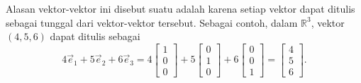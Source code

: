 Alasan vektor-vektor ini disebut suatu \emph{} adalah karena setiap
vektor dapat ditulis sebagai \emph{} tunggal dari vektor-vektor tersebut.
Sebagai contoh, dalam ${\mathbb R}^3$, vektor $(4,5,6)$ dapat ditulis sebagai
\begin{equation*}
4 \vec{e}_1 +
5 \vec{e}_2 +
6 \vec{e}_3
=
4
\begin{bmatrix}
1 \\ 0 \\ 0
\end{bmatrix}
+
5
\begin{bmatrix}
0 \\ 1 \\ 0
\end{bmatrix}
+
6
\begin{bmatrix}
0 \\ 0 \\ 1
\end{bmatrix}
=
\begin{bmatrix}
4 \\ 5 \\ 6
\end{bmatrix} .
\end{equation*}

